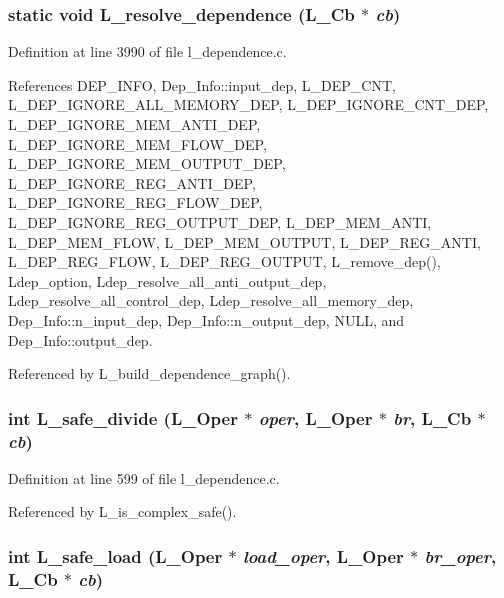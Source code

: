\subsubsection{\setlength{\rightskip}{0pt plus 5cm}static void L\_\-resolve\_\-dependence (L\_\-Cb $\ast$ {\em cb})\hspace{0.3cm}{\tt  [static]}}\label{l__dependence_8c_56894a0f24c76910fce610ba3b58c237}




Definition at line 3990 of file l\_\-dependence.c.

References DEP\_\-INFO, Dep\_\-Info::input\_\-dep, L\_\-DEP\_\-CNT, L\_\-DEP\_\-IGNORE\_\-ALL\_\-MEMORY\_\-DEP, L\_\-DEP\_\-IGNORE\_\-CNT\_\-DEP, L\_\-DEP\_\-IGNORE\_\-MEM\_\-ANTI\_\-DEP, L\_\-DEP\_\-IGNORE\_\-MEM\_\-FLOW\_\-DEP, L\_\-DEP\_\-IGNORE\_\-MEM\_\-OUTPUT\_\-DEP, L\_\-DEP\_\-IGNORE\_\-REG\_\-ANTI\_\-DEP, L\_\-DEP\_\-IGNORE\_\-REG\_\-FLOW\_\-DEP, L\_\-DEP\_\-IGNORE\_\-REG\_\-OUTPUT\_\-DEP, L\_\-DEP\_\-MEM\_\-ANTI, L\_\-DEP\_\-MEM\_\-FLOW, L\_\-DEP\_\-MEM\_\-OUTPUT, L\_\-DEP\_\-REG\_\-ANTI, L\_\-DEP\_\-REG\_\-FLOW, L\_\-DEP\_\-REG\_\-OUTPUT, L\_\-remove\_\-dep(), Ldep\_\-option, Ldep\_\-resolve\_\-all\_\-anti\_\-output\_\-dep, Ldep\_\-resolve\_\-all\_\-control\_\-dep, Ldep\_\-resolve\_\-all\_\-memory\_\-dep, Dep\_\-Info::n\_\-input\_\-dep, Dep\_\-Info::n\_\-output\_\-dep, NULL, and Dep\_\-Info::output\_\-dep.

Referenced by L\_\-build\_\-dependence\_\-graph().
\subsubsection{\setlength{\rightskip}{0pt plus 5cm}int L\_\-safe\_\-divide (L\_\-Oper $\ast$ {\em oper}, L\_\-Oper $\ast$ {\em br}, L\_\-Cb $\ast$ {\em cb})}\label{l__dependence_8c_4ec7e635172f1105374c3845236ee264}




Definition at line 599 of file l\_\-dependence.c.

Referenced by L\_\-is\_\-complex\_\-safe().
\subsubsection{\setlength{\rightskip}{0pt plus 5cm}int L\_\-safe\_\-load (L\_\-Oper $\ast$ {\em load\_\-oper}, L\_\-Oper $\ast$ {\em br\_\-oper}, L\_\-Cb $\ast$ {\em cb})}\label{l__dependence_8c_430a6d43709bb20d872c3e66699c09f2}




